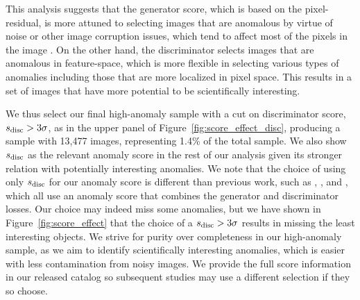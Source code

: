 This analysis suggests that the generator score, which is based on the pixel-residual, is more attuned to selecting images that are anomalous by virtue of noise or other image corruption issues, which tend to affect most of the pixels in the image .
On the other hand, the discriminator selects images that are anomalous in feature-space, which is more flexible in selecting various types of anomalies including those that are more localized in pixel space.
This results in a set of images that have more potential to be scientifically interesting.


We thus select our final high-anomaly sample with a cut on discriminator score, $s_\mathrm{disc}>3\sigma$, as in the upper panel of Figure~\ref{fig:score_effect_disc}, producing a sample with 13,477 images, representing 1.4\% of the total sample. 
We also show $s_\mathrm{disc}$ as the relevant anomaly score in the rest of our analysis given its stronger relation with potentially interesting anomalies.
We note that the choice of using only $s_\mathrm{disc}$ for our anomaly score is different than previous work, such as \cite{Schlegl2017}, \cite{Zenati2018a}, and \cite{Margalef-Bentabol2020}, which all use an anomaly score that combines the generator and discriminator losses.
Our choice may indeed miss some anomalies, but we have shown in Figure~\ref{fig:score_effect} that the choice of a $s_\mathrm{disc}>3\sigma$ results in missing the least interesting objects.
We strive for purity over completeness in our high-anomaly sample, as we aim to identify scientifically interesting anomalies, which is easier with less contamination from noisy images.
We provide the full score information in our released catalog so subsequent studies may use a different selection if they so choose.



